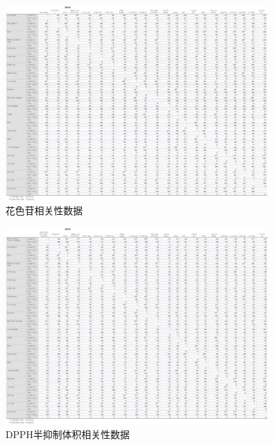 \documentclass[UTF8]{ctexart}
\begin{document}
				\begin{figure}[H]\centering
				\includegraphics[width=0.9\textwidth]{img/花色苷相关性数据.png} %
				\caption{花色苷相关性数据} %
				\label{fig:figure 1} %
				\end{figure}

				\begin{figure}[H]\centering
				\includegraphics[width=0.9\textwidth]{img/DPPH半抑制体积相关性数据.png}
				\caption{DPPH半抑制体积相关性数据} %
				\label{fig:figure 2} %
				\end{figure}
			
\end{document}
